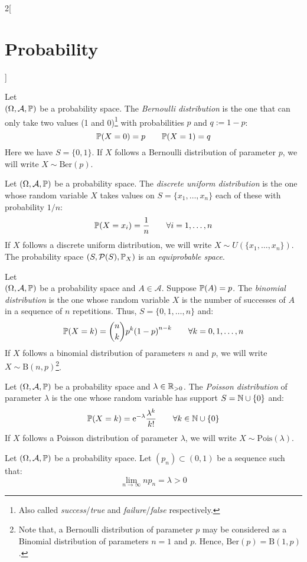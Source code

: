 \documentclass[../../../main.tex]{subfiles}
\begin{document}
\begin{multicols}{2}[\section{Probability}]
\begin{definition}
    Let\\ $(\Omega,\mathcal{A},\mathbb{P})$ be a probability space. The \textit{Bernoulli distribution} is the one that can only take two values (1 and 0)\footnote{Also called \textit{success}/\textit{true} and \textit{failure}/\textit{false} respectively.} with probabilities $p$ and $q:=1-p$: $$\mathbb{P}(X=0)=p\qquad \mathbb{P}(X=1)=q$$ Here we have $S=\{0,1\}$. If $X$ follows a Bernoulli distribution of parameter $p$, we will write $X\sim \text{Ber}(p)$.
  \end{definition}
  \begin{definition}
    Let $(\Omega,\mathcal{A},\mathbb{P})$ be a probability space. The \textit{discrete uniform distribution} is the one whose random variable $X$ takes values on $S=\{x_1,\ldots,x_n\}$ each of these with probability $1/n$: $$\mathbb{P}(X=x_i)=\frac{1}{n}\qquad \forall i=1,\ldots,n$$ If $X$ follows a discrete uniform distribution, we will write $X\sim U(\{x_1,\ldots,x_n\})$. The probability space $(S,\mathcal{P}(S),\mathbb{P}_X)$ is an \textit{equiprobable space}.
  \end{definition}
  \begin{definition}
    Let\\ $(\Omega,\mathcal{A},\mathbb{P})$ be a probability space and $A\in\mathcal{A}$. Suppose $\mathbb{P}(A)=p$. The \textit{binomial distribution} is the one whose random variable $X$ is the number of successes of $A$ in a sequence of $n$ repetitions. Thus, $S=\{0,1,\ldots,n\}$ and: $$\mathbb{P}(X=k)=\binom{n}{k}p^k{(1-p)}^{n-k}\qquad \forall k=0,1,\ldots,n$$ If $X$ follows a binomial distribution of parameters $n$ and $p$, we will write $X\sim \text{B}(n,p)$\footnote{Note that, a Bernoulli distribution of parameter $p$ may be considered as a Binomial distribution of parameters $n=1$ and $p$. Hence, $\text{Ber}(p)=\text{B}(1,p)$.}.
  \end{definition}
  \begin{definition}
    Let $(\Omega,\mathcal{A},\mathbb{P})$ be a probability space and $\lambda\in\mathbb{R}_{>0}$. The \textit{Poisson distribution} of parameter $\lambda$ is the one whose random variable has support $S=\mathbb{N}\cup\{0\}$ and: $$\mathbb{P}(X=k)=\mathrm{e}^{-\lambda}\frac{\lambda^k}{k!}\qquad \forall k\in\mathbb{N}\cup\{0\}$$ If $X$ follows a Poisson distribution of parameter $\lambda$, we will write $X\sim \text{Pois}(\lambda)$.
  \end{definition}
  \begin{theorem}
    Let $(\Omega,\mathcal{A},\mathbb{P})$ be a probability space. Let $(p_n)\subset(0,1)$ be a sequence such that: $$\lim_{n\to\infty}np_n=\lambda>0$$

\end{theorem}
\end{multicols}
\end{document}
